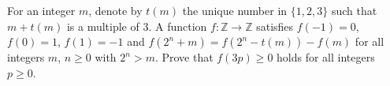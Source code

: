 For an integer $ m$,  denote by $ t(m)$ the unique number in $ \{1, 2, 3\}$ such that $ m + t(m)$ is a multiple of $ 3$. A function $ f: \mathbb{Z}\to\mathbb{Z}$ satisfies $ f( - 1) = 0$,  $ f(0) = 1$,  $ f(1) = - 1$ and $ f\left(2^{n} + m\right) = f\left(2^n - t(m)\right) - f(m)$ for all integers $ m$,  $ n\ge 0$ with $ 2^n > m$. Prove that $ f(3p)\ge 0$ holds for all integers $ p\ge 0$.